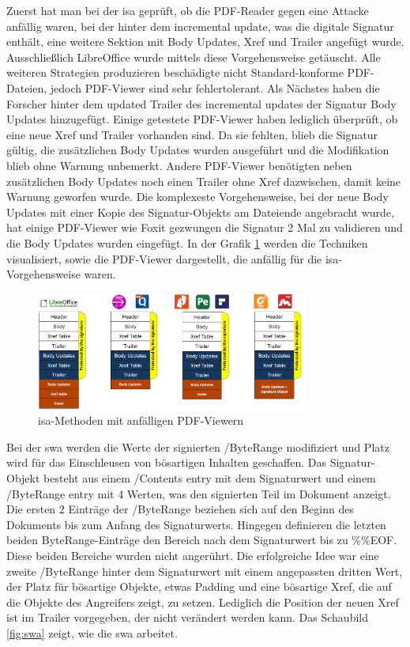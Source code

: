 Zuerst hat man bei der \gls{isa} geprüft, ob die PDF-Reader gegen eine Attacke anfällig waren, bei der hinter dem incremental update, was die digitale Signatur enthält, eine weitere Sektion mit Body Updates, Xref und Trailer angefügt wurde. Ausschließlich LibreOffice wurde mittels diese Vorgehensweise getäuscht. Alle weiteren Strategien produzieren beschädigte nicht Standard-konforme PDF-Dateien, jedoch PDF-Viewer sind sehr fehlertolerant. Als Nächstes haben die Forscher hinter dem updated Trailer des incremental updates der Signatur Body Updates hinzugefügt. Einige getestete PDF-Viewer haben lediglich überprüft, ob eine neue Xref und Trailer vorhanden sind. Da sie fehlten, blieb die Signatur gültig, die zusätzlichen Body Updates wurden ausgeführt und die Modifikation blieb ohne Warnung unbemerkt. Andere PDF-Viewer benötigten neben zusätzlichen Body Updates noch einen Trailer ohne Xref dazwischen, damit keine Warnung geworfen wurde. Die komplexeste Vorgehensweise, bei der neue Body Updates mit einer Kopie des Signatur-Objekts am Dateiende angebracht wurde, hat einige PDF-Viewer wie Foxit gezwungen die Signatur 2 Mal zu validieren und die Body Updates wurden eingefügt. In der Grafik \ref{fig:isa} werden die Techniken visualisiert, sowie die PDF-Viewer dargestellt, die anfällig für die \gls{isa}-Vorgehensweise waren.
\par

\begin{figure}[!htbp]
	\centering
	\includegraphics[width=0.8\textwidth]{"images/isa.png"}
	\caption{\gls{isa}-Methoden mit anfälligen PDF-Viewern \cite{ccc-break-pdf-slides}}
	\label{fig:isa}
\end{figure}

Bei der \gls{swa} werden die Werte der signierten /ByteRange modifiziert und Platz wird für das Einschleusen von bösartigen Inhalten geschaffen. Das Signatur-Objekt besteht aus einem /Contents entry mit dem Signaturwert und einem /ByteRange entry mit 4 Werten, was den signierten Teil im Dokument anzeigt. Die ersten 2 Einträge der /ByteRange beziehen sich auf den Beginn des Dokuments bis zum Anfang des Signaturwerts. Hingegen definieren die letzten beiden ByteRange-Einträge den Bereich nach dem Signaturwert bis zu \%\%EOF. Diese beiden Bereiche wurden nicht angerührt. Die erfolgreiche Idee war eine zweite /ByteRange hinter dem Signaturwert mit einem angepassten dritten Wert, der Platz für bösartige Objekte, etwas Padding und eine bösartige Xref, die auf die Objekte des Angreifers zeigt, zu setzen. Lediglich die Position der neuen Xref ist im Trailer vorgegeben, der nicht verändert werden kann. Das Schaubild \ref{fig:swa} zeigt, wie die \gls{swa} arbeitet.
\par

